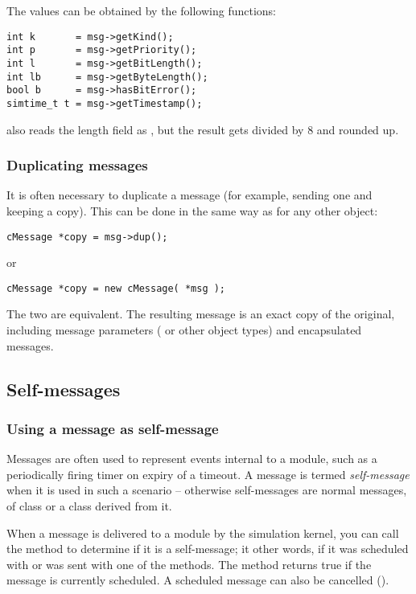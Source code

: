 The values can be obtained by the following functions:

\begin{verbatim}
int k       = msg->getKind();
int p       = msg->getPriority();
int l       = msg->getBitLength();
int lb      = msg->getByteLength();
bool b      = msg->hasBitError();
simtime_t t = msg->getTimestamp();
\end{verbatim}

 also reads the length field as ,
but the result gets divided by 8 and rounded up.


\subsubsection{Duplicating messages}

It is often necessary to duplicate a message (for example, sending
one and keeping a copy). This can be done in the same way as
for any other {\opp} object:

\begin{verbatim}
cMessage *copy = msg->dup();
\end{verbatim}

or

\begin{verbatim}
cMessage *copy = new cMessage( *msg );
\end{verbatim}


The two are equivalent. The resulting message is an exact copy
of the original, including message parameters ( or other
object types) and encapsulated messages.


\subsection{Self-messages}

\subsubsection{Using a message as self-message}

Messages are often used to represent events internal to a module,
such as a periodically firing timer on expiry of a timeout.
A message is termed \textit{self-message} when it is used
in such a scenario -- otherwise self-messages are normal messages,
of class  or a class derived from it.

When a message is delivered to a module by the simulation kernel,
you can call the  method to determine if it is
a self-message; it other words, if it was scheduled with
 or was sent with one of the
 methods. The  method
returns true if the message is currently scheduled. A scheduled
message can also be cancelled ().

